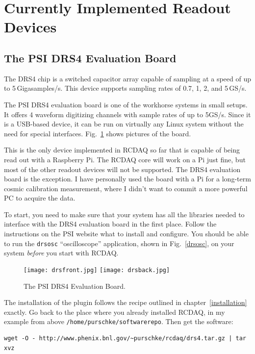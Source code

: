 \documentclass{article}[11pt]
\begin{document}
\section{Currently Implemented Readout Devices}

\subsection{The PSI DRS4 Evaluation Board}
\label{instructions}

The DRS4 chip is a switched capacitor array capable of sampling at a
speed of up to 5\,Gigasamples/s. This device supports sampling rates
of 0.7, 1, 2, and 5\,GS/s. 

The PSI DRS4 evaluation board is one of the workhorse systems in small
setups. It offers 4 waveform digitizing channels with sample rates of
up to 5GS/s. Since it is a USB-based device, it can be run on
virtually any Linux system without the need for special
interfaces. Fig.~\ref{drsevalboard} shows pictures of the board.

This is the only device implemented in RCDAQ so far that is capable of
being read out with a Raspberry Pi. The RCDAQ core will work on a Pi
just fine, but most of the other readout devices will not be
supported. The DRS4 evaluation board is the exception. I have
personally used the board with a Pi for a long-term cosmic calibration
measurement, where I didn't want to commit a more powerful PC to
acquire the data.

To start, you need to make sure that your system has all the libraries
needed to interface with the DRS4 evaluation board in the first
place. Follow the instructions on the PSI website what to install and
configure.  You should be able to run the \verb|drsosc|
``oscilloscope'' application, shown in Fig.~\ref{drsosc}, on your
system \emph{before} you start with RCDAQ.

\begin{figure}
  \centering
  \texttt{[image: drsfront.jpg]}
  \texttt{[image: drsback.jpg]}
  \caption{\label{drsevalboard}The PSI DRS4 Evaluation Board.}
\end{figure}

The installation of the plugin follows the recipe outlined in
chapter~\ref{installation} exactly. Go back to the place where you
already installed RCDAQ, in my example from above
\verb|/home/purschke/softwarerepo|. Then get the software:

\begin{verbatim}
wget -O - http://www.phenix.bnl.gov/~purschke/rcdaq/drs4.tar.gz | tar xvz
\end{verbatim}
\end{document}

